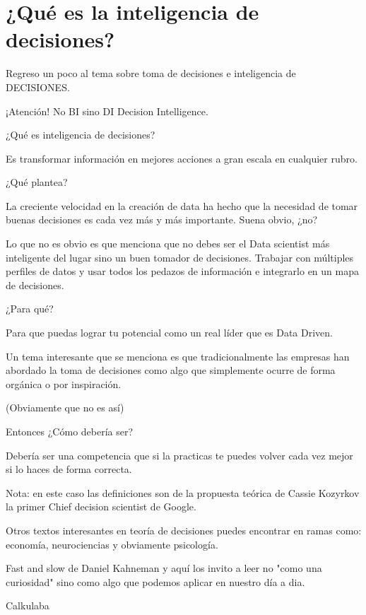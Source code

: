 \chapter{¿Qué es la inteligencia de decisiones?}
\label{Cap1}
Regreso un poco al tema sobre toma de decisiones e inteligencia de DECISIONES. 


¡Atención! No BI sino DI Decision Intelligence. 


¿Qué es inteligencia de decisiones? 


Es transformar información en mejores acciones a gran escala en cualquier rubro. 


¿Qué plantea? 


La creciente velocidad en la creación de data ha hecho que la necesidad de tomar buenas decisiones es cada vez más y más importante. Suena obvio, ¿no? 


Lo que no es obvio es que menciona que no debes ser el Data scientist más inteligente del lugar sino un buen tomador de decisiones. Trabajar con múltiples perfiles de datos y usar todos los pedazos de información e integrarlo en un mapa de decisiones. 


¿Para qué?


Para que puedas lograr tu potencial como un real líder que es Data Driven. 


Un tema interesante que se menciona es que tradicionalmente las empresas han abordado la toma de decisiones como algo que simplemente ocurre de forma orgánica o por inspiración. 


(Obviamente que no es así)


Entonces ¿Cómo debería ser?


Debería ser una competencia que si la practicas te puedes volver cada vez mejor si lo haces de forma correcta. 


Nota: en este caso las definiciones son de la propuesta teórica de Cassie Kozyrkov la primer Chief decision scientist de Google. 




Otros textos interesantes en teoría de decisiones puedes encontrar en ramas como: economía, neurociencias y obviamente psicología. 


Fast and slow de Daniel Kahneman y aquí los invito a leer no "como una curiosidad" sino como algo que podemos aplicar en  nuestro día a dia. 


Calkulaba


